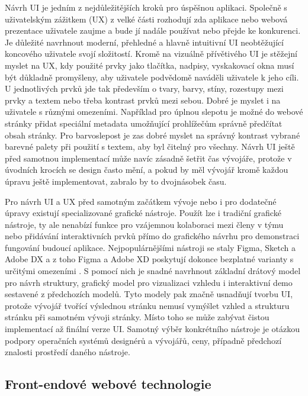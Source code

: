 	Návrh \ac{UI} je jedním z nejdůležitějších kroků pro úspěšnou aplikaci.
	Společně s uživatelským zážitkem (\noindent\ac{UX}) z velké části rozhodují zda aplikace nebo webová prezentace
	uživatele zaujme a bude jí nadále používat nebo přejde ke konkurenci.
	Je důležité navrhnout moderní, přehledné a hlavně intuitivní \ac{UI} neobtěžující koncového uživatele svojí složitostí.
	Kromě na vizuálně přívětivého \ac{UI} je stěžejní myslet na \ac{UX}, kdy použité prvky jako tlačítka, nadpisy,
	vyskakovací okna musí být důkladně promyšleny, aby uživatele podvědomě naváděli uživatele k jeho cíli.
	U jednotlivých prvků jde tak především o tvary, barvy, stíny, rozestupy mezi prvky a textem nebo třeba kontrast prvků
	mezi sebou.
	Dobré je myslet i na uživatele s různými omezeními.
	Například pro úplnou slepotu je možné do webové stránky přidat speciální metadata umožňující prohlížečům správně
	předčítat obsah stránky.
	Pro barvoslepost je zas dobré myslet na správný kontrast vybrané barevné palety při použití s textem, aby byl
	čitelný pro všechny.
	Návrh \ac{UI} ještě před samotnou implementací může navíc zásadně šetřit čas vývojáře, protože v úvodních krocích
	se design často mění, a pokud by měl vývojář kromě každou úpravu ještě implementovat, zabralo by to dvojnásobek času.

	Pro návrh \ac{UI} a \ac{UX} před samotným začátkem vývoje nebo i pro dodatečné úpravy existují specializované
	grafické nástroje.
	Použít lze i tradiční grafické nástroje, ty ale nenabízí funkce pro vzájemnou kolaboraci mezi
	členy v týmu nebo přidávání interaktivních prvků přímo do grafického návrhu pro demonstraci fungování budoucí
	aplikace.
	Nejpopulárnějšími nástroji se staly Figma, Sketch a Adobe DX a z toho Figma a Adobe XD poskytují dokonce bezplatné
	varianty s určitými omezeními \cite{design_tools_database}.
	S pomocí nich je snadné navrhnout základní drátový model pro návrh struktury, grafický model pro vizualizaci
	vzhledu i interaktivní demo sestavené z předchozích modelů.
	Tyto modely pak značně usnadňují tvorbu \ac{UI}, protože vývojář tvořící výslednou stránku nemusí vymýšlet
	vzhled a strukturu stránku při samotném vývoji stránky.
	Místo toho se může zabývat čistou implementací až finální verze \ac{UI}.
	Samotný výběr konkrétního nástroje je otázkou podpory operačních systémů designérů a vývojářů, ceny, případně
	předchozí znalosti prostředí daného nástroje.

	\subsection{Front-endové webové technologie}

